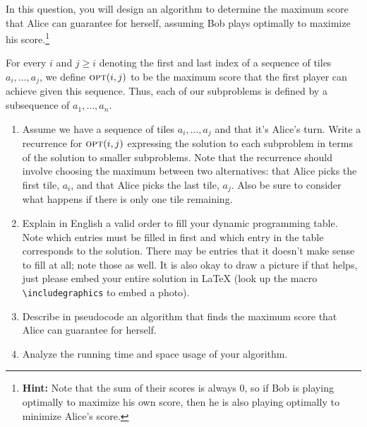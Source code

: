 \documentclass[11pt]{article}
\newcommand{\opt}{\textsc{opt}}
\theoremstyle{definition}
\theoremstyle{theorem}
\newcommand{\solution}{\medskip\noindent{\color{DarkBlue}\textbf{Solution:}}}
\begin{document}
In this question, you will design an algorithm to determine the maximum score that Alice can guarantee for herself, assuming Bob plays optimally to maximize his score.\footnote{\textbf{Hint:} Note that the sum of their scores is always $0$, so if Bob is playing optimally to maximize his own score, then he is also playing optimally to minimize Alice's score.}

For every $i$ and $j\geq i$ denoting the first and last index of a sequence of tiles $a_i, \ldots, a_j$, we define $\opt(i,j)$ to be the maximum score that the first player can achieve given this sequence. Thus, each of our subproblems is defined by a subsequence of $a_1, \ldots, a_n$.


\begin{enumerate}[label=(\alph*)]
	\item Assume we have a sequence of tiles $a_i, \ldots, a_j$ and that it's Alice's turn. Write a recurrence for  $\opt(i,j)$ expressing the solution to each subproblem in terms of the solution to smaller subproblems. Note that the recurrence should involve choosing the maximum between two alternatives: that Alice picks the first tile, $a_i$, and that Alice picks the last tile, $a_j$. 	Also be sure to consider what happens if there is only one tile remaining.
	
	\solution
	
	\item Explain in English a valid order to fill your dynamic programming table. Note which entries must be filled in first and which entry in the table corresponds to the solution. There may be entries that it doesn't make sense to fill at all; note those as well. It is also okay to draw a picture if that helps, just please embed your entire solution in LaTeX (look up the macro \lstinline!\includegraphics! to embed a photo).
	
	\solution 
	
	\item Describe in pseudocode an algorithm that finds the maximum score that Alice can guarantee for herself.
	
	\solution
	
	\item Analyze the running time and space usage of your algorithm.
	
	\solution
	
\end{enumerate}
\end{document}
